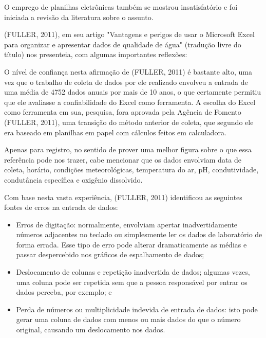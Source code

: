 O emprego de planilhas eletrônicas também se mostrou insatisfatório e foi iniciada a revisão da literatura sobre o assunto.

(FULLER, 2011), em seu artigo "Vantagens e perigos de usar o Microsoft Excel para organizar e apresentar dados de qualidade de água" (tradução livre do título) nos presenteia, com algumas importantes reflexões:


\noindent\begin{flushright}\mbox{\linespread{1}\selectfont\centering{}}\end{flushright}


O nível de confiança nesta afirmação de (FULLER, 2011) é bastante alto, uma vez que o trabalho de coleta de dados por ele realizado envolveu a entrada de uma média de 4752 dados anuais por mais de 10 anos, o que certamente permitiu que ele avaliasse a confiabilidade do Excel como ferramenta. A escolha do Excel como ferramenta em sua, pesquisa, fora aprovada pela Agência de Fomento  (FULLER, 2011), uma transição do método anterior de coleta, que segundo ele era baseado em planilhas em papel com cálculos feitos em calculadora.

Apenas para registro, no sentido de prover uma melhor figura sobre o que essa referência pode nos trazer, cabe mencionar que os dados envolviam data de coleta, horário, condições meteorológicas, temperatura do ar, pH, condutividade, condutância específica e oxigênio dissolvido.

Com base nesta vasta experiência,  (FULLER, 2011) identificou as seguintes fontes de erros na entrada de dados:


\begin{itemize}
\item Erros de digitação: normalmente, envolviam apertar inadvertidamente números adjacentes no teclado ou simplesmente ler os dados de laboratório de forma errada. Esse tipo de erro pode alterar dramaticamente as médias e passar despercebido nos gráficos de espalhamento de dados;
\item Deslocamento de colunas e repetição inadvertida de dados; algumas vezes, uma coluna pode ser repetida sem que a pessoa responsável por entrar os dados perceba, por exemplo; e
\item Perda de números ou multiplicidade indevida de entrada de dados: isto pode gerar uma coluna de dados com menos ou mais dados do que o número original, causando um deslocamento nos dados.
\end{itemize}

